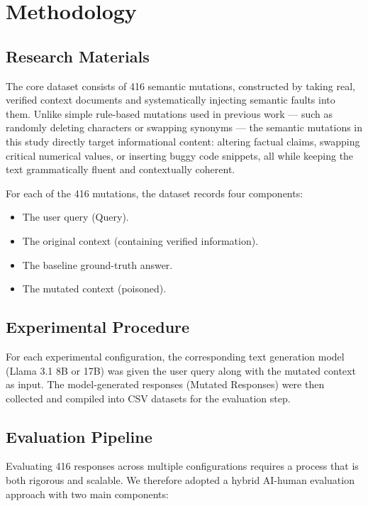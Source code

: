 \section{Methodology}

\subsection{Research Materials}
The core dataset consists of 416 semantic mutations, constructed by taking real, verified context documents and systematically injecting semantic faults into them. Unlike simple rule-based mutations used in previous work --- such as randomly deleting characters or swapping synonyms --- the semantic mutations in this study directly target informational content: altering factual claims, swapping critical numerical values, or inserting buggy code snippets, all while keeping the text grammatically fluent and contextually coherent.

For each of the 416 mutations, the dataset records four components:

\begin{itemize}
\item The user query (Query).
\item The original context (containing verified information).
\item The baseline ground-truth answer.
\item The mutated context (poisoned).
\end{itemize}

\subsection{Experimental Procedure}
For each experimental configuration, the corresponding text generation model (Llama 3.1 8B or 17B) was given the user query along with the mutated context as input. The model-generated responses (Mutated Responses) were then collected and compiled into CSV datasets for the evaluation step.

\subsection{Evaluation Pipeline}
Evaluating 416 responses across multiple configurations requires a process that is both rigorous and scalable. We therefore adopted a hybrid AI-human evaluation approach with two main components:

